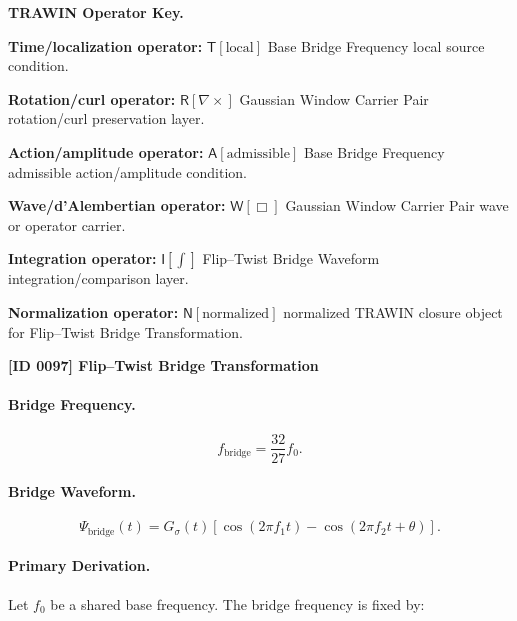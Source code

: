 \par\vspace{0.45\baselineskip}
\noindent\begin{minipage}[t]{\linewidth}
\begingroup
\small
\raggedright
\textbf{TRAWIN Operator Key.}\par
\noindent\textbf{Time/localization operator:} $\mathsf{T}\!\left[\mathrm{local}\right]$ Base Bridge Frequency local source condition.\par
\noindent\textbf{Rotation/curl operator:} $\mathsf{R}\!\left[\nabla\times\right]$ Gaussian Window Carrier Pair rotation/curl preservation layer.\par
\noindent\textbf{Action/amplitude operator:} $\mathsf{A}\!\left[\mathrm{admissible}\right]$ Base Bridge Frequency admissible action/amplitude condition.\par
\noindent\textbf{Wave/d'Alembertian operator:} $\mathsf{W}\!\left[\Box\right]$ Gaussian Window Carrier Pair wave or operator carrier.\par
\noindent\textbf{Integration operator:} $\mathsf{I}\!\left[\int\right]$ Flip--Twist Bridge Waveform integration/comparison layer.\par
\noindent\textbf{Normalization operator:} $\mathsf{N}\!\left[\mathrm{normalized}\right]$ normalized TRAWIN closure object for Flip--Twist Bridge Transformation.\par
\endgroup
\end{minipage}

\clearpage
\noindent\textbf{[ID 0097] Flip--Twist Bridge Transformation}\par
\vspace{0.35em}
\paragraph{Bridge Frequency.}
\begin{equation}
f_{\mathrm{bridge}}=\frac{32}{27}f_0.
\end{equation}

\paragraph{Bridge Waveform.}
\begin{equation}
\Psi_{\mathrm{bridge}}(t)
=
G_{\sigma}(t)
\left[
\cos(2\pi f_1t)
-
\cos(2\pi f_2t+\theta)
\right].
\end{equation}

\paragraph{Primary Derivation.}
Let $f_0$ be a shared base frequency.  
The bridge frequency is fixed by:


